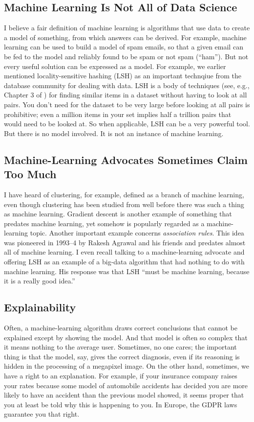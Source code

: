 \documentclass[11pt]{article}
\begin{document}
\subsection{Machine Learning Is Not All of Data Science}

I believe a fair definition of machine learning is algorithms that use data to create a model of something, from which answers can be derived.  For example, machine learning can be used to build a model of spam emails, so that a given email can be fed to the model and reliably found to be spam or not spam (``ham'').  But not every useful solution can be expressed as a model.  For example, we earlier mentioned locality-sensitive hashing (LSH) as an important technqiue from the database community for dealing with data.  LSH is a body of techniques (see, e.g., Chapter 3 of \cite{mmds}) for finding similar items in a dataset without having to look at all pairs.  You don't need for the dataset to be very large before looking at all pairs is prohibitive; even a million items in your set implies half a trillion pairs that would need to be looked at.  So when applicable, LSH can be a very powerful tool.  But there is no model involved.  It is not an instance of machine learning.

\subsection{Machine-Learning Advocates Sometimes Claim Too Much}

I have heard of clustering, for example, defined as a branch of machine learning, even though clustering has been studied from well before there was such a thing as machine learning.  Gradient descent is another example of something that predates machine learning, yet somehow is popularly regarded as a machine-learning topic.  Another important example concerns {\em association rules}.  This idea was pioneered in 1993--4 by Rakesh Agrawal and his friends \cite{ais} \cite{as} and predates almost all of machine learning.   I even recall talking to a machine-learning advocate and offering LSH as an example of a big-data algorithm that had nothing to do with machine learning.  His response was that LSH ``must be machine learning, because it is a really good idea.''

\subsection{Explainability}

Often, a machine-learning algorithm draws correct conclusions that cannot be explained except by showing the model.  And that model is often so complex that it means nothing to the average user.  Sometimes, no one cares; the important thing is that the model, say, gives the correct diagnosis, even if its reasoning is hidden in the processing of a megapixel image.  On the other hand, sometimes, we have a right to an explanation.  For example, if your insurance company raises your rates because some model of automobile accidents has decided you are more likely to have an accident than the previous model showed, it seems proper that you at least be told why this is happening to you.  In Europe, the GDPR laws \cite{gdpr} guarantee you that right.
\end{document}
